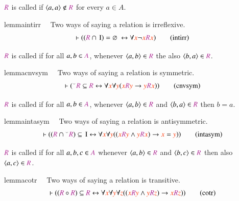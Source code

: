 $\mc{R}$ is called  if $\langle a,a\rangle\notin \mc{R}$ for every $a\in A$. 
\begin{restatable}{lemma}{intirr}~~ Two ways of saying a relation is
irreflexive.  
\begin{align}
\vdash ( ( \mc{R} \cap \,\mathrm{I} ) = \varnothing~ \leftrightarrow \forall
    \msc{x} \lnot \msc{x} \mc{R} \msc{x} )\label{eq:intirr}\tag{intirr}
\end{align}
\end{restatable}

 $\mc{R}$ is called  if for all $a,b\in \mc{A}$, whenever $\langle a,b\rangle\in \mc{R}$ the also $\langle b,a\rangle\in \mc{R}$.
\begin{restatable}{lemma}{cnvsym}~~ Two ways of saying a relation is symmetric. 
\begin{align}
\vdash ( {}^{\smallsmile} \mc{R} \subseteq \mc{R} \leftrightarrow \forall
    \msc{x} \forall \msc{y} ( \msc{x} \mc{R} \msc{y} \rightarrow \msc{y} \mc{R}
    \msc{x} ) )\label{eq:cnvsym}\tag{cnvsym}
\end{align}
\end{restatable}

 $\mc{R}$ is called  if for all $a,b\in  \mc{A}$, whenever 
$\langle a,b\rangle\in \mc{R}$ and $\langle b,a\rangle\in \mc{R}$ then $b=a$.  
\begin{restatable}{lemma}{intasym}~~ Two ways of saying a relation is
antisymmetric.  
\begin{align}
\vdash ( ( \mc{R} \cap {}^{\smallsmile} \mc{R} ) \subseteq \,\mathrm{I}
    \leftrightarrow \forall \msc{x} \forall \msc{y} ( ( \msc{x} \mc{R} \msc{y}
    \wedge \msc{y} \mc{R} \msc{x} ) \rightarrow \msc{x} = \msc{y} )
    )\label{eq:intasym}\tag{intasym}
\end{align}
\end{restatable}

$\mc{R}$ is called  if for all $a,b,c\in  \mc{A}$ whenever $\langle a,b\rangle\in \mc{R}$ and $\langle b,c\rangle\in \mc{R}$ then also $\langle a,c\rangle\in \mc{R}$.
\begin{restatable}{lemma}{cotr}~~ Two ways of saying a relation is transitive. 
\begin{align}
\vdash ( ( \mc{R} \circ \mc{R} ) \subseteq \mc{R} \leftrightarrow \forall
    \msc{x} \forall \msc{y} \forall \msc{z} ( ( \msc{x} \mc{R} \msc{y} \wedge
    \msc{y} \mc{R} \msc{z} ) \rightarrow \msc{x} \mc{R} \msc{z} )
    )\label{eq:cotr}\tag{cotr}
\end{align}
\end{restatable}

